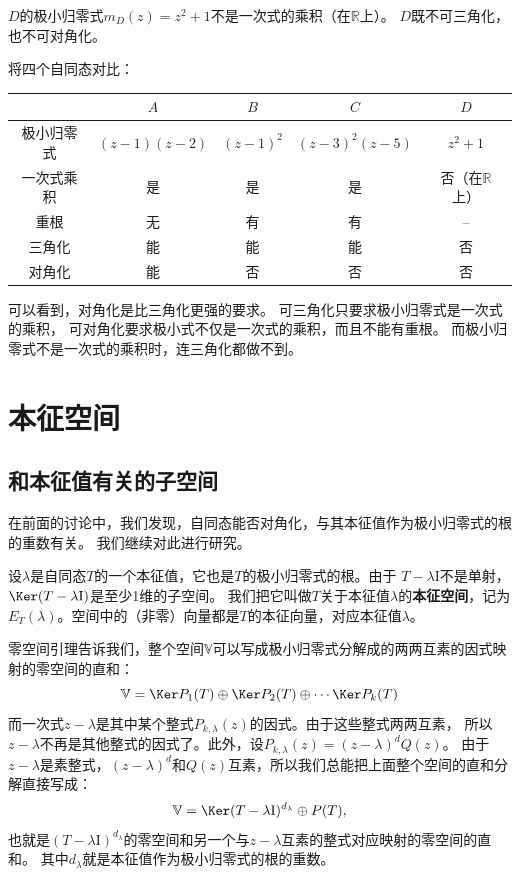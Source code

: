 \documentclass[12pt,UTF8,fontset=none]{ctexbook}
\begin{document}
$D$的极小归零式$m_D(z) = z^2 + 1$不是一次式的乘积（在$\mathbb{R}$上）。
$D$既不可三角化，也不可对角化。

将四个自同态对比：
\begin{center}
\begin{tabular}{|c|c|c|c|c|}
\hline
 & $A$ & $B$ & $C$ & $D$ \\
\hline
极小归零式 & $(z-1)(z-2)$ & $(z-1)^2$ & $(z-3)^2(z-5)$ & $z^2+1$ \\
\hline
一次式乘积 & 是 & 是 & 是 & 否（在$\mathbb{R}$上） \\
\hline
重根 & 无 & 有 & 有 & -- \\
\hline
三角化 & 能 & 能 & 能 & 否 \\
\hline
对角化 & 能 & 否 & 否 & 否 \\
\hline
\end{tabular}
\end{center}

可以看到，对角化是比三角化更强的要求。
可三角化只要求极小归零式是一次式的乘积，
可对角化要求极小式不仅是一次式的乘积，而且不能有重根。
而极小归零式不是一次式的乘积时，连三角化都做不到。

\section{本征空间}
\subsection{和本征值有关的子空间}
在前面的讨论中，我们发现，自同态能否对角化，与其本征值作为极小归零式的根的重数有关。
我们继续对此进行研究。

设$\lambda$是自同态$T$的一个本征值，它也是$T$的极小归零式的根。由于
$T - \lambda \mathrm{I}$不是单射，$\Ker (T - \lambda \mathrm{I})$是至少1维的子空间。
我们把它叫做$T$关于本征值$\lambda$的\textbf{本征空间}，记为$E_T(\lambda)$。空间中的（非零）向量都是$T$的本征向量，对应本征值$\lambda$。

零空间引理告诉我们，整个空间$\mathbb{V}$可以写成极小归零式分解成的两两互素的因式映射的零空间的直和：
$$ \mathbb{V} = \Ker P_1(T) \oplus \Ker P_2(T) \oplus \cdots \Ker P_k(T)$$
而一次式$z - \lambda$是其中某个整式$P_{k,\lambda}(z)$的因式。由于这些整式两两互素，
所以$z - \lambda$不再是其他整式的因式了。此外，设$P_{k,\lambda}(z) = (z - \lambda)^{d} Q(z)$。
由于$z - \lambda$是素整式，$(z - \lambda)^{d}$和$Q(z)$互素，所以我们总能把上面整个空间的直和分解直接写成：
$$ \mathbb{V} = \Ker (T - \lambda\mathrm{I})^{d_\lambda} \oplus P(T),$$
也就是$(T - \lambda\mathrm{I})^{d_\lambda}$的零空间和另一个与$z - \lambda$互素的整式对应映射的零空间的直和。
其中$d_\lambda$就是本征值作为极小归零式的根的重数。
\end{document}
